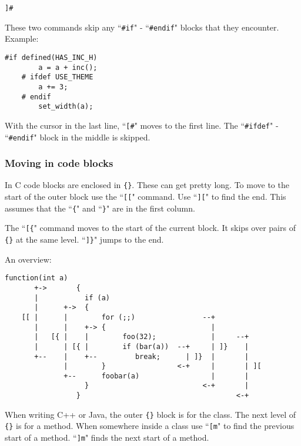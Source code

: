 \begin{Verbatim}[samepage=true]
 ]#
\end{Verbatim}

These two commands skip any ``\texttt{\#if}" - ``\texttt{\#endif}" blocks that they encounter.
Example:

\begin{Verbatim}[samepage=true]
    #if defined(HAS_INC_H) 
        a = a + inc(); 
    # ifdef USE_THEME 
        a += 3; 
    # endif 
        set_width(a); 
\end{Verbatim}

With the cursor in the last line, ``\texttt{[\#}" moves to the first line.
The ``\texttt{\#ifdef}" - ``\texttt{\#endif}" block in the middle is skipped.
\subsubsection{Moving in code blocks}
In C code blocks are enclosed in \texttt{\{\}}.
These can get pretty long.
To move to the start of the outer block use the ``\texttt{[[}" command.
Use ``\texttt{][}" to find the end.
This assumes that the ``\texttt{\{}" and ``\texttt{\}}" are in the first column.

The ``\texttt{[\{}" command moves to the start of the current block.
It skips over pairs of \texttt{\{\}} at the same level.
``\texttt{]\}}" jumps to the end.

An overview:

\begin{Verbatim}[samepage=true]
                 function(int a)
       +->       {
       |           if (a)
       |      +->  {
    [[ |      |        for (;;)                --+
       |      |    +-> {                         |
       |   [{ |    |        foo(32);             |     --+
       |      | [{ |        if (bar(a))  --+     | ]}    |
       +--    |    +--         break;      | ]}  |       |
              |        }                 <-+     |       | ][
              +--      foobar(a)                 |       |
                   }                           <-+       |
                 }                                     <-+
\end{Verbatim}

When writing C++ or Java, the outer \texttt{\{\}} block is for the class.
The next level of \texttt{\{\}} is for a method.
When somewhere inside a class use ``\texttt{[m}" to find the previous start of a method.
``\texttt{]m}" finds the next start of a method.

